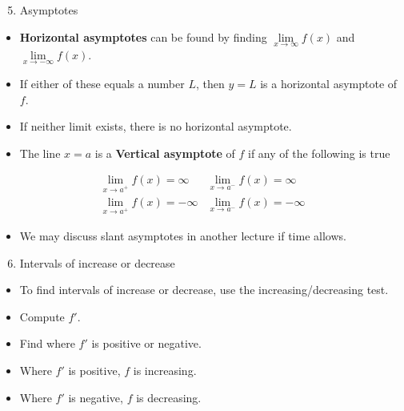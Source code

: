 \begin{frame}[t]
\begin{enumerate}
\setcounter{enumi}{4}
\item  Asymptotes
\end{enumerate}
\begin{itemize}
\item  \textbf{Horizontal asymptotes} can be found by finding $\lim\limits_{x\to\infty} f(x)$ and $\lim\limits_{x\to -\infty} f(x)$.
\item  If either of these equals a number $L$, then $y = L$ is a horizontal asymptote of $f$.  
\item  If neither limit exists, there is no horizontal asymptote.
\item  The line $x = a$ is a \textbf{Vertical asymptote} of $f$ if any of the following is true
\end{itemize}
\[
\begin{array}{ll}
\displaystyle \lim_{x\to a^+}f(x) = \infty &%
\displaystyle \lim_{x\to a^-}f(x) = \infty \\%
\displaystyle \lim_{x\to a^+}f(x) = -\infty &%
\displaystyle \lim_{x\to a^-}f(x) = -\infty %
\end{array}
\]
\begin{itemize}
\item  We may discuss slant asymptotes in another lecture if time allows.
\end{itemize}
\end{frame}


\begin{frame}[t]
\begin{enumerate}
\setcounter{enumi}{5}
\item  Intervals of increase or decrease
\end{enumerate}
\begin{itemize}
\item  To find intervals of increase or decrease, use the increasing/decreasing test.
\item  Compute $f'$.
\item  Find where $f'$ is positive or negative.
\item  Where $f'$ is positive, $f$ is increasing.
\item  Where $f'$ is negative, $f$ is decreasing.
\end{itemize}
\end{frame}




